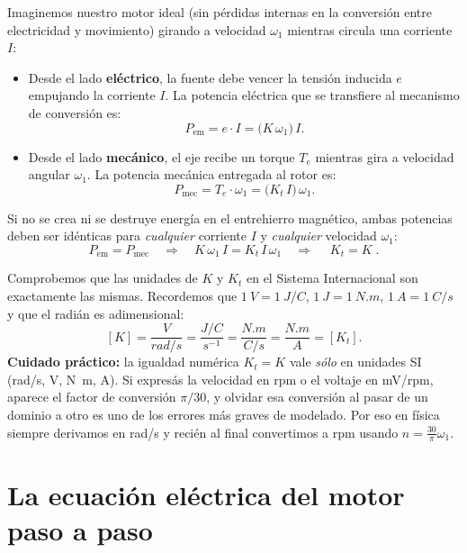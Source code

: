 \documentclass[11pt,a4paper,oneside]{book}
\begin{document}
Imaginemos nuestro motor ideal (sin pérdidas internas en la conversión entre
electricidad y movimiento) girando a velocidad $\omega_1$ mientras circula una
corriente $I$:
\begin{itemize}
  \item Desde el lado \textbf{eléctrico}, la fuente debe vencer la tensión
        inducida $e$ empujando la corriente $I$. La potencia eléctrica que se
        transfiere al mecanismo de conversión es:
        \[
          P_{\text{em}} = e\cdot I = \big(K\,\omega_1\big)\,I.
        \]
  \item Desde el lado \textbf{mecánico}, el eje recibe un torque $T_e$ mientras
        gira a velocidad angular $\omega_1$. La potencia mecánica entregada al
        rotor es:
        \[
          P_{\text{mec}} = T_e\cdot \omega_1 = \big(K_t\,I\big)\,\omega_1.
        \]
\end{itemize}
Si no se crea ni se destruye energía en el entrehierro magnético, ambas
potencias deben ser idénticas para \emph{cualquier} corriente $I$ y
\emph{cualquier} velocidad $\omega_1$:
\begin{equation}
  P_{\text{em}} = P_{\text{mec}}
  \quad\Longrightarrow\quad
  K\,\omega_1\,I = K_t\,I\,\omega_1
  \quad\Longrightarrow\quad
  \boxed{\;K_t = K\;.}
  \label{eq:kt_igual_k}
\end{equation}

\begin{unidades}
Comprobemos que las unidades de $K$ y $K_t$ en el Sistema Internacional son
exactamente las mismas. Recordemos que $\SI{1}{V} = \SI{1}{J/C}$,
$\SI{1}{J} = \SI{1}{N.m}$, $\SI{1}{A} = \SI{1}{C/s}$ y que el radián es
adimensional:
\[
  [K] = \frac{\si{V}}{\si{rad/s}}
      = \frac{\si{J/C}}{\si{s^{-1}}}
      = \frac{\si{N.m}}{\si{C/s}}
      = \frac{\si{N.m}}{\si{A}}
      = [K_t].
\]
\textbf{Cuidado práctico:} la igualdad numérica $K_t = K$ vale \emph{sólo} en
unidades SI (\si{rad/s}, \si{V}, \si{N.m}, \si{A}). Si expresás la velocidad en
rpm o el voltaje en \si{mV/rpm}, aparece el factor de conversión $\pi/30$, y
olvidar esa conversión al pasar de un dominio a otro es uno de los errores más
graves de modelado. Por eso en física siempre derivamos en \si{rad/s} y recién
al final convertimos a rpm usando $n = \frac{30}{\pi}\omega_1$.
\end{unidades}

\section{La ecuación eléctrica del motor paso a paso}
\end{document}
